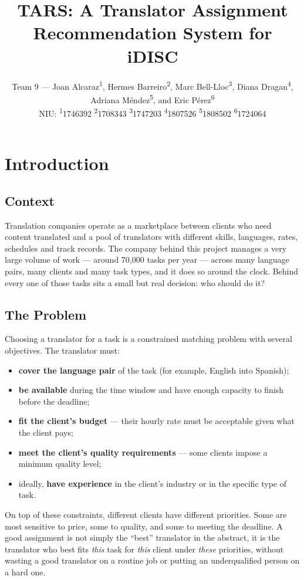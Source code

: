 \documentclass[9pt,a4paper,twoside]{utils/tau-class/tau}
\title{TARS: A Translator Assignment Recommendation System for iDISC}
\author{Team 9 --- Joan Alcaraz\textsuperscript{1}, Hermes Barreiro\textsuperscript{2}, Marc Bell-Lloc\textsuperscript{3}, Diana Dragan\textsuperscript{4}, Adriana M\'endez\textsuperscript{5}, and Eric P\'erez\textsuperscript{6}\par\vspace{4pt}
{\normalfont\footnotesize NIU: \textsuperscript{1}1746392 \quad \textsuperscript{2}1708343 \quad \textsuperscript{3}1747203 \quad \textsuperscript{4}1807526 \quad \textsuperscript{5}1808502 \quad \textsuperscript{6}1724064}}
\begin{document}
    \maketitle
    \thispagestyle{firststyle} \tauabstract
    \tableofcontents


\section{Introduction}

\subsection{Context}

Translation companies operate as a marketplace between clients who need content translated and a pool of translators with different skills, languages, rates, schedules and track records. The company behind this project manages a very large volume of work --- around 70,000 tasks per year --- across many language pairs, many clients and many task types, and it does so around the clock. Behind every one of those tasks sits a small but real decision: who should do it?

\subsection{The Problem}

Choosing a translator for a task is a constrained matching problem with several objectives. The translator must:

\begin{itemize}
    \item \textbf{cover the language pair} of the task (for example, English into Spanish);
    \item \textbf{be available} during the time window and have enough capacity to finish before the deadline;
    \item \textbf{fit the client's budget} --- their hourly rate must be acceptable given what the client pays;
    \item \textbf{meet the client's quality requirements} --- some clients impose a minimum quality level;
    \item ideally, \textbf{have experience} in the client's industry or in the specific type of task.
\end{itemize}

On top of these constraints, different clients have different priorities. Some are most sensitive to price, some to quality, and some to meeting the deadline. A good assignment is not simply the ``best'' translator in the abstract, it is the translator who best fits \emph{this} task for \emph{this} client under \emph{these} priorities, without wasting a good translator on a routine job or putting an underqualified person on a hard one.
\end{document}
